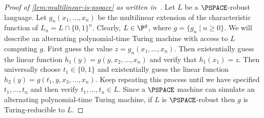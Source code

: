 \documentclass[english]{reedthesis}
\theoremstyle{plain}
\newtheorem{thm}{Theorem}[section]
\theoremstyle{definition}
\theoremstyle{remark}
\begin{document}
\begin{appendices}
\begin{proof}[{Proof of \cref{lem:multilinear-is-pspace} as written in~\cite{BFL90}}]
  Let $L$ be a $\PSPACE$-robust language. Let $g_{n}(x_{1}, \ldots, x_{n})$ be the
  multilinear extension of the characteristic function of
  $L_{n} = L \cap \{0, 1\}^{n}$. Clearly, $L \in \P^{g}$, where
  $g = \{g_{n} \mid n \ge 0\}$. We will describe an alternating polynomial-time
  Turing machine with access to $L$ computing $g$. First guess the value
  $z = g_{n}(x_{1}, \ldots, x_{n})$. Then existentially guess the linear function
  $h_{1}(y) = g(y, x_{2}, \ldots, x_{n})$ and verify that $h_{1}(x_{1}) = z$. Then
  universally choose $t_{1} \in \{0, 1\}$ and existentially guess the linear
  function $h_{2}(y) = g(t_{1}, y, x_{3}, \ldots, x_{n})$. Keep repeating this
  process until we have specified $t_{1}, \ldots, t_{n}$ and then verify
  $t_{1}, \ldots, t_{n} \in L$. Since a $\PSPACE$ machine can simulate an alternating
  polynomial-time Turing machine, if $L$ is $\PSPACE$-robust then $g$ is
  Turing-reducible to $L$.
\end{proof}





\end{appendices}
\end{document}
